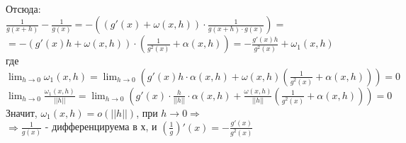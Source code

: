 \\
Отсюда:
\\
$\frac{1}{g(x+h)}-\frac{1}{g(x)}=-((g'(x)+\omega(x,h))\cdot\frac{1}{g(x+h)\cdot g(x)})=$
\\
$=-(g'(x)h+\omega(x,h))\cdot(\frac{1}{g^2(x)}+\alpha(x,h))=-\frac{g'(x)h}{g^2(x)}+\omega_1(x,h)$
\\
где $\lim_{h\to 0}\omega_1(x,h)=\lim_{h\to 0}(g'(x)h\cdot\alpha(x,h)+\omega(x,h)(\frac{1}{g^2(x)}+\alpha(x,h)))=0$
\\
$\lim_{h\to 0}\frac{\omega_1(x,h)}{||h||}=\lim_{h\to 0}(g'(x)\cdot\frac{h}{||h||}\cdot\alpha(x,h)+\frac{\omega(x,h)}{||h||}(\frac{1}{g^2(x)}+\alpha(x,h)))=0$
\\
Значит, $\omega_1(x,h)=o(||h||)$, при $h\to 0\Rightarrow$
\\
$\Rightarrow\frac{1}{g(x)}$ - дифференцируема в х, и $(\frac{1}{g})'(x)=-\frac{g'(x)}{g^2(x)}$
\\
\dokno








